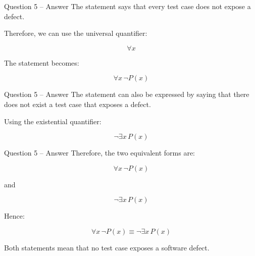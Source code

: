 \begin{frame}{Question 5 -- Answer}
The statement says that every test case does not expose a defect.

Therefore, we can use the universal quantifier:

$$
\forall x
$$

The statement becomes:

$$
\boxed{\forall x\,\neg P(x)}
$$

\end{frame}

\begin{frame}{Question 5 -- Answer}
The statement can also be expressed by saying that there does not exist
a test case that exposes a defect.

Using the existential quantifier:

$$
\boxed{\neg\exists x\,P(x)}
$$

\end{frame}

\begin{frame}{Question 5 -- Answer}
Therefore, the two equivalent forms are:

$$
\forall x\,\neg P(x)
$$

and

$$
\neg\exists x\,P(x)
$$

Hence:

$$
\boxed{\forall x\,\neg P(x)
\equiv
\neg\exists x\,P(x)}
$$

Both statements mean that no test case exposes a software defect.
\end{frame}

